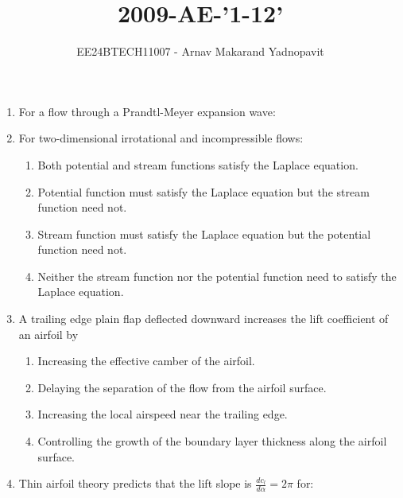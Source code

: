 \documentclass[journal,12pt,onecolumn]{IEEEtran}
\theoremstyle{remark}
\begin{document}
\title{2009-AE-'1-12'}
\author{EE24BTECH11007 - Arnav Makarand Yadnopavit}
\maketitle
\renewcommand{\thefigure}{\theenumi}
\renewcommand{\thetable}{\theenumi}
\begin{enumerate}
\item For a flow through a Prandtl-Meyer expansion wave:
\begin{enumerate}
\end{enumerate}
\item For two-dimensional irrotational and incompressible flows:
\begin{enumerate}
\item Both potential and stream functions satisfy the Laplace equation.
\item Potential function must satisfy the Laplace equation but the stream function need not.
\item Stream function must satisfy the Laplace equation but the potential function need not.
\item Neither the stream function nor the potential function need to satisfy the Laplace equation.
\end{enumerate}
\item A trailing edge plain flap deflected downward increases the lift coefficient of an airfoil by
\begin{enumerate}
\item Increasing the effective camber of the airfoil.
\item Delaying the separation of the flow from the airfoil surface.
\item Increasing the local airspeed near the trailing edge.
\item Controlling the growth of the boundary layer thickness along the airfoil surface.
\end{enumerate}
\item Thin airfoil theory predicts that the lift slope is $\frac{dc_l}{d\alpha}=2\pi$ for:
\begin{enumerate}

\end{enumerate}
\end{enumerate}
\end{document}
